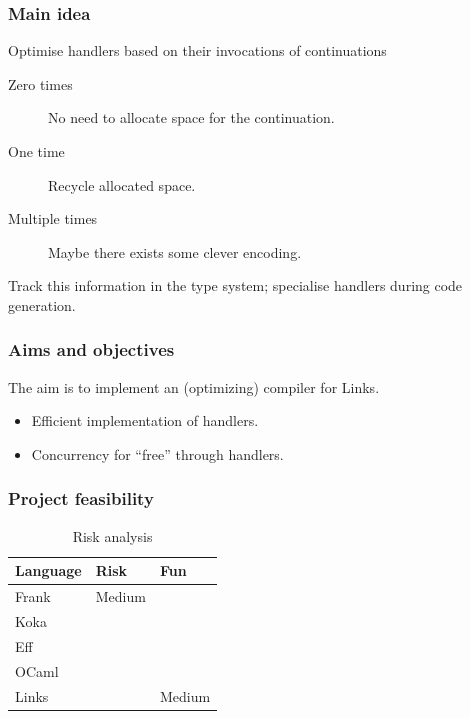 \documentclass[10pt,compress]{beamer}
\begin{document}
  \begin{frame}
    \frametitle{Main idea}
    Optimise handlers based on their invocations of continuations
    \begin{description}
      \item[\alert<1->{Zero times}] No need to allocate space for the continuation.
      \item[\alert<1->{One time}] Recycle allocated space.
      \item[\alert<1->{Multiple times}] Maybe there exists some clever encoding.
    \end{description}
    Track this information in the type system; specialise handlers during code generation.
  \end{frame}

  \begin{frame}
    \frametitle{Aims and objectives}
    The aim is to implement an (optimizing) compiler for Links.
    \begin{itemize}
       \item Efficient implementation of handlers.
       \item Concurrency for ``free'' through handlers.
    \end{itemize}
  \end{frame}

  \begin{frame}
    \frametitle{Project feasibility}
    \begin{table}
      \centering
      \begin{tabular}{| l | l | l|}
        \hline
        Language & Risk   & Fun \\
        \hline
        Frank    & Medium & {\color{red}{High}} \\
        \hline
        Koka     & {\color{red}{High}}   & {\color{red}{High}} \\
        \hline
        Eff      & {\color{red}{High}}   & {\color{red}{High}} \\
        \hline
        OCaml    & {\color{red}{High}}   & {\color{red}{High}} \\
        \hline
        Links    & {\color{green}{Low}}    & Medium \\
        \hline
      \end{tabular}
      \caption{Risk analysis}
    \end{table}
  \end{frame}
\end{document}
